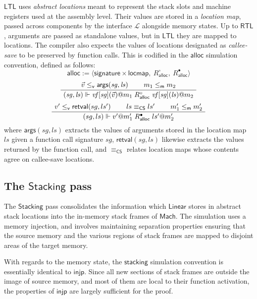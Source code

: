 \documentclass[acmsmall,authordraft]{acmart}
\newcommand{\kw}[1]{\ensuremath{ \mathsf{#1} }}
\newcommand{\que}{\circ}
\newcommand{\ans}{\bullet}
\newcommand{\vref}{\le_\kw{v}}
\newcommand{\mext}{\le_\kw{m}}
\begin{document}
\kw{LTL} uses \emph{abstract locations}
meant to represent the stack slots and machine registers
used at the assembly level.
Their values are stored in a \emph{location map},
passed across components by the interface $\mathcal{L}$
alongside memory states.
Up to \kw{RTL},
arguments are passed as standalone values,
but in \kw{LTL}
they are mapped to locations.
The compiler also expects the values of
locations designated as \emph{callee-save}
to be preserved by function calls.
This is codified in the $\kw{alloc}$
simulation convention, defined as follows:
\[
  \kw{alloc} := \langle
      \kw{signature} \times \kw{locmap}, \:
      R_\kw{alloc}^\que, \:
      R_\kw{alloc}^\ans \rangle
\]
\[
  \AxiomC{$\vec{v} \vref \kw{args}(\mathit{sg}, \mathit{ls})$}
  \AxiomC{$m_1 \mext m_2$}
  \BinaryInfC{$
      (\mathit{sg}, \mathit{ls}) \Vdash
      \mathit{vf}[\mathit{sg}](\vec{v})@m_1
      \mathrel{R_\kw{alloc}^\que}
      \mathit{vf}[\mathit{sg}](\mathit{ls})@m_2$}
  \DisplayProof
\]
\[
  \AxiomC{$v' \vref \kw{retval}(sg, ls')$}
  \AxiomC{$ls \equiv_\kw{CS} ls'$}
  \AxiomC{$m_1' \mext m_2'$}
  \TrinaryInfC{$
      (sg, ls) \Vdash
      v'@m_1'
      \mathrel{R_\kw{alloc}^\ans}
      ls'@m_2'$}
  \DisplayProof
\]
where $\kw{args}(\mathit{sg}, \mathit{ls})$ extracts the values of arguments
stored in the location map $\mathit{ls}$ given
a function call signature $\mathit{sg}$,
$\kw{retval}(\mathit{sg}, \mathit{ls})$ likewise extracts the
values returned by the function call, and
$\equiv_\kw{CS}$ relates location maps whose contents agree
on callee-save locations.


\subsection{The \kw{Stacking} pass} %

The \kw{Stacking} pass
consolidates the information which
\kw{Linear} stores in abstract stack locations
into the in-memory stack frames of \kw{Mach}.
The simulation uses a memory injection,
and involves maintaining separation properties
ensuring that the source memory and
the various regions of stack frames
are mapped to disjoint areas of the target memory.

With regards to the memory state,
the \kw{stacking} simulation convention
is essentially identical to \kw{injp}.
Since all new sections of stack frames
are outside the image of source memory,
and most of them are local to
their function activation,
the properties of \kw{injp}
are largely sufficient for the proof.
\end{document}

